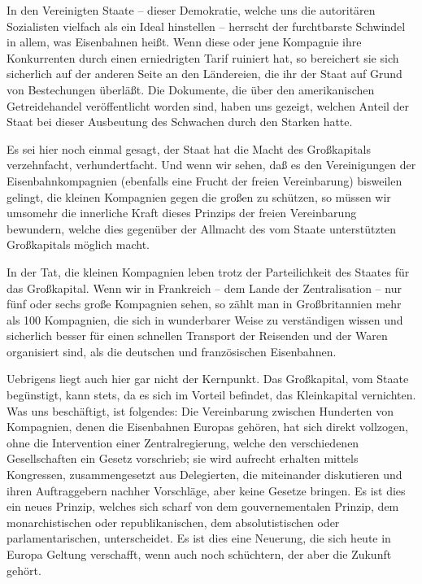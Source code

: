 \documentclass{scrbook}
\begin{document}
In den Vereinigten Staate – dieser Demokratie, welche uns die autoritären Sozialisten vielfach als ein Ideal hinstellen – herrscht der furchtbarste Schwindel in allem, was Eisenbahnen heißt. Wenn diese oder jene Kompagnie ihre Konkurrenten durch einen erniedrigten Tarif ruiniert hat, so bereichert sie sich sicherlich auf der anderen Seite an den Ländereien, die ihr der Staat auf Grund von Bestechungen überläßt. Die Dokumente, die über den amerikanischen Getreidehandel veröffentlicht worden sind, haben uns gezeigt, welchen Anteil der Staat bei dieser Ausbeutung des Schwachen durch den Starken hatte.

Es sei hier noch einmal gesagt, der Staat hat die Macht des Großkapitals verzehnfacht, verhundertfacht. Und wenn wir sehen, daß es den Vereinigungen der Eisenbahnkompagnien (ebenfalls eine Frucht der freien Vereinbarung) bisweilen gelingt, die kleinen Kompagnien gegen die großen zu schützen, so müssen wir umsomehr die innerliche Kraft dieses Prinzips der freien Vereinbarung bewundern, welche dies gegenüber der Allmacht des vom Staate unterstützten Großkapitals möglich macht.

In der Tat, die kleinen Kompagnien leben trotz der Parteilichkeit des Staates für das Großkapital. Wenn wir in Frankreich – dem Lande der Zentralisation – nur fünf oder sechs große Kompagnien sehen, so zählt man in Großbritannien mehr als 100 Kompagnien, die sich in wunderbarer Weise zu verständigen wissen und sicherlich besser für einen schnellen Transport der Reisenden und der Waren organisiert sind, als die deutschen und französischen Eisenbahnen.

Uebrigens liegt auch hier gar nicht der Kernpunkt. Das Großkapital, vom Staate begünstigt, kann stets, da es sich im Vorteil befindet, das Kleinkapital vernichten. Was uns beschäftigt, ist folgendes: Die Vereinbarung zwischen Hunderten von Kompagnien, denen die Eisenbahnen Europas gehören, hat sich direkt vollzogen, ohne die Intervention einer Zentralregierung, welche den verschiedenen Gesellschaften ein Gesetz vorschrieb; sie wird aufrecht erhalten mittels Kongressen, zusammengesetzt aus Delegierten, die miteinander diskutieren und ihren Auftraggebern nachher Vorschläge, aber keine Gesetze bringen. Es ist dies ein neues Prinzip, welches sich scharf von dem gouvernementalen Prinzip, dem monarchistischen oder republikanischen, dem absolutistischen oder parlamentarischen, unterscheidet. Es ist dies eine Neuerung, die sich heute in Europa Geltung verschafft, wenn auch noch schüchtern, der aber die Zukunft gehört.
\end{document}
